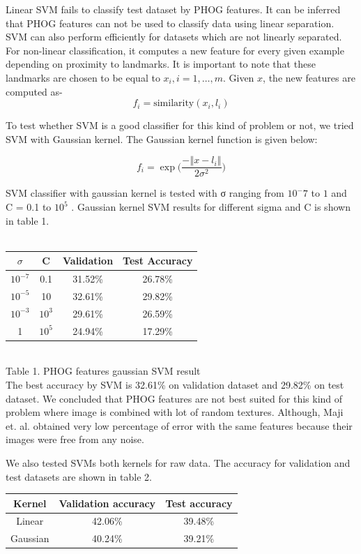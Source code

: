 \documentclass[10pt,twocolumn]{article}
\begin{document}
Linear SVM fails to classify test dataset by PHOG features. It can be inferred that PHOG features can not be used to classify data using linear separation.
SVM can also perform efficiently for datasets which are not linearly separated. For non-linear classification, it computes a new feature for every given example depending on proximity to landmarks. It is important to note that these landmarks are chosen to be equal to $x_i, i=1,…,m$. Given $x$, the new features are computed as-
\[f_i=\text{similarity}(x_i,l_i)\]
 
To test whether SVM is a good classifier for this kind of problem or not, we tried SVM with Gaussian kernel. The Gaussian kernel function is given below:

\[f_i=\exp\Big(\frac{-‖x-l_i ‖}{2\sigma^2 }\Big)\]

SVM classifier with gaussian kernel is tested with σ ranging from $10^-7$ to $1$ and C = 0.1 to $10^5$ \cite {larochelle2007empirical}. Gaussian kernel SVM results for different sigma and C is shown in table 1. 
\\
\\
\begin{tabular}{|c|c|c|c|}
\hline
$\sigma$ & C &	Validation & Test Accuracy \\
\hline
$10^{-7}$  & 0.1	& 31.52\%	& 26.78\% \\
$10^{-5}$	 & 10	& 32.61\%	& 29.82\% \\
$10^{-3}$	 & $10^3$ & 29.61\%	& 26.59\% \\
1        &$10^5$ & 	24.94\% & 	17.29\% \\
\hline
\end{tabular}
\\

Table 1. PHOG features gaussian SVM result
\\

The best accuracy by SVM is 32.61\% on validation dataset and 29.82\% on test dataset. We concluded that PHOG features are not best suited for this kind of problem where image is combined with lot of random textures. Although, Maji et. al. obtained very low percentage of error with the same features because their images were free from any noise.

We also tested SVMs both kernels for raw data. The accuracy for validation and test datasets are shown in table 2.
\\

\begin{tabular}{|c|c|c|}
\hline
Kernel & Validation accuracy & Test accuracy \\ \hline
Linear & 42.06\% & 39.48\% \\
Gaussian & 40.24\% & 39.21\% \\
\hline
\end{tabular}
\\
\end{document}
